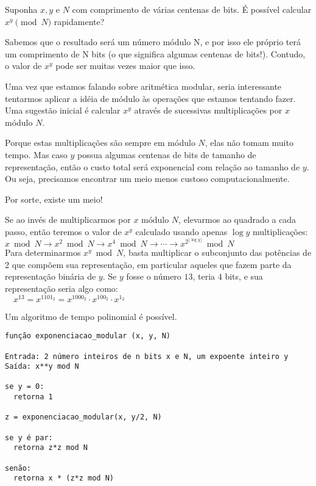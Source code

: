 Suponha $x, y \textrm{ e } N$ com comprimento de várias centenas de bits. É
possível calcular $x^y \pmod N$ rapidamente?

Sabemos que o resultado será um número módulo N, e por isso ele próprio terá
um comprimento de N bits (o que significa algumas centenas de bits!). Contudo,
o valor de $x^y$ pode ser muitas vezes maior que isso.

Uma vez que estamos falando sobre aritmética modular, seria interessante
tentarmos aplicar a idéia de módulo às operações que estamos tentando fazer.
Uma sugestão inicial é calcular $x^y$ através de sucessivas multiplicações por
$x$ módulo $N$.

Porque estas multiplicações são sempre em módulo $N$, elas não tomam muito
tempo. Mas caso $y$ possua algumas centenas de bits de tamanho de
representação, então o custo total será exponencial com relação ao tamanho de
$y$. Ou seja, precisamos encontrar um meio menos custoso computacionalmente.

Por sorte, existe um meio!

Se ao invés de multiplicarmos por $x \textrm{ módulo } N$, elevarmos ao
quadrado a cada passo, então teremos o valor de $x^y$ calculado usando apenas
$\log y$ multiplicações:\\

$x \bmod N \to x^2 \bmod N \to x^4 \bmod N \to\cdots\to x^{2^{\lfloor\log
y\rfloor}} \bmod N$\\

Para determinarmos $x^y \bmod N$, basta multiplicar o subconjunto das
potências de 2 que compõem sua representação, em particular aqueles que fazem
parte da representação binária de $y$. Se $y$ fosse o número $13$, teria $4$
bits, e sua representação seria algo como:\\

$\quad x^{13} = x^{1101_2} = x^{1000_2} \cdot x^{100_2} \cdot x^{1_2}$

\vspace{1.2em}
Um algoritmo de tempo polinomial é possível.

\begin{verbatim}
função exponenciacao_modular (x, y, N)

Entrada: 2 número inteiros de n bits x e N, um expoente inteiro y
Saída: x**y mod N

se y = 0:
  retorna 1

z = exponenciacao_modular(x, y/2, N)

se y é par:
  retorna z*z mod N

senão:
  retorna x * (z*z mod N)

\end{verbatim}

